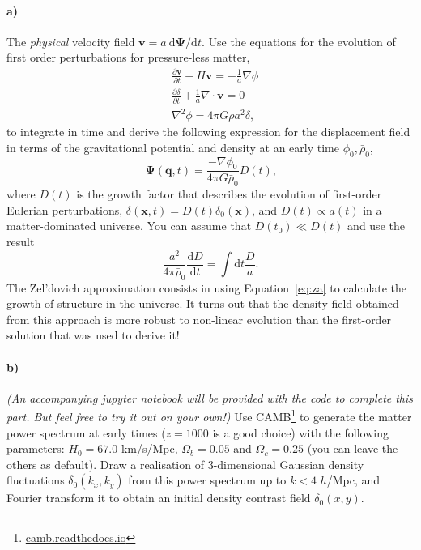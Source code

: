 \documentclass[12pt]{article}
\newcommand\diff{\mathrm{d}}
\begin{document}
\paragraph{a)} The \emph{physical} velocity field $\mathbf{v} = a\: \diff\mathbf{\Psi}/\diff t$. Use
the equations for the evolution of first order perturbations for pressure-less
matter,
\begin{equation}
\begin{aligned}
    &\frac{\partial \mathbf{v}}{\partial t} + H \mathbf{v} = - \frac{1}{a} \nabla \phi \\
    &\frac{\partial \delta}{\partial t} + \frac{1}{a} \nabla \cdot \mathbf{v} = 0\\
    &\nabla^2 \phi = 4 \pi G \bar{\rho} a^2 \delta \text{,}
\end{aligned}
\label{eq:first-order}
\end{equation}
to integrate in time and derive the following expression for the displacement
field in terms of the gravitational potential and density at an early time
$\phi_0, \bar{\rho}_0$,
\begin{equation}
    \mathbf{\Psi}(\mathbf{q}, t) = \frac{-\nabla \phi_0}{4 \pi G \bar{\rho}_0} D(t)
    \text{,}
\label{eq:za}
\end{equation}
where $D(t)$ is the growth factor that describes the evolution of first-order
Eulerian perturbations, $\delta(\mathbf{x}, t) = D(t) \delta_0(\mathbf{x})$, and
$D(t) \propto a(t)$ in a matter-dominated universe. You can assume that $D(t_0)
\ll D(t)$ and use the result
\begin{equation}
    \frac{a^2}{4 \pi \bar{\rho}_0} \frac{\diff D}{\diff t} = \int \diff t \frac{D}{a} \text{.}
\end{equation}
The Zel'dovich approximation consists in using Equation~\ref{eq:za} to calculate
the growth of structure in the universe. It turns out that the density field
obtained from this approach is more robust to non-linear evolution than the
first-order solution that was used to derive it!

\paragraph{b)} \emph{(An accompanying jupyter notebook will be provided with the
code to complete this part. But feel free to try it out on your own!)} Use
CAMB\footnote{\url{camb.readthedocs.io}} to generate the matter power spectrum
at early times ($z=1000$ is a good choice) with the following parameters: $H_0 =
67.0$ km/s/Mpc, $\Omega_b = 0.05$ and $\Omega_c = 0.25$ (you can leave the
others as default). Draw a realisation of 3-dimensional Gaussian density
fluctuations $\delta_0(k_x, k_y)$ from this power spectrum up to $k < 4$
$h$/Mpc, and Fourier transform it to obtain an initial density contrast field
$\delta_0(x, y)$.
\end{document}
